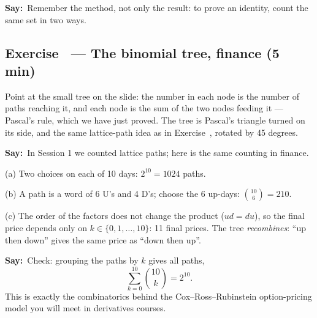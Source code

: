 \documentclass[11pt,a4paper,parskip=half]{scrartcl}
\newcommand{\say}{\textbf{\color{teal}Say:}\ }
\newcommand{\slide}[1]{\marginpar{\raggedright\footnotesize\color{gray}slide #1}}
\begin{document}
\say Remember the method, not only the result: to prove an identity, count
the same set in two ways.

\subsection{Exercise~ --- The binomial tree, finance (5 min)}\slide{21}


\begin{cue}
	Point at the small tree on the slide: the number in each node is the
	number of paths reaching it, and each node is the sum of the two nodes
	feeding it --- Pascal's rule, which we have just proved. The tree is
	Pascal's triangle turned on its side, and the same lattice-path idea as in
	Exercise~, rotated by 45 degrees.
\end{cue}

\say In Session 1 we counted lattice paths; here is the same counting in
finance.

(a) Two choices on each of 10 days: $2^{10} = 1024$ paths.

(b) A path is a word of 6 U's and 4 D's; choose the 6 up-days:
$\binom{10}{6} = 210$.

(c) The order of the factors does not change the product ($ud = du$), so the
final price depends only on $k\in\{0,1,\dots,10\}$: 11 final prices. The
tree \emph{recombines}: ``up then down'' gives the same price as ``down then
up''.

\say Check: grouping the paths by $k$ gives all paths,
\[ \sum_{k=0}^{10}\binom{10}{k} = 2^{10}. \]
This is exactly the combinatorics
behind the Cox--Ross--Rubinstein option-pricing model you will meet in
derivatives courses.
\end{document}
